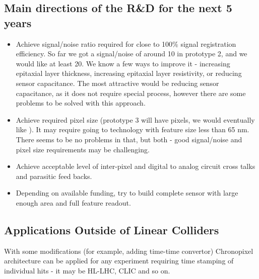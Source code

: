 \subsection{Main directions of the R\&D for the next 5 years}
\begin{itemize}
    \item Achieve signal/noise ratio required for close to 100\% signal registration efficiency. So far we got a signal/noise of around 10 in prototype 2, and we would like at least 20. We know a few ways to improve it - increasing epitaxial layer thickness, increasing epitaxial layer resistivity, or reducing sensor capacitance. The most attractive would be reducing sensor capacitance, as it does not require special process, however there are some problems to be solved with this approach.
    \item Achieve required pixel size (prototype 3 will have \unit[25]{\micron} pixels, we would eventually like \unit[15]{\micron}). It may require going to technology with feature size less than 65 nm. There seems to be no problems in that, but both - good signal/noise and pixel size requirements may be challenging.
    \item Achieve acceptable level of inter-pixel and digital to analog circuit cross talks and parasitic feed backs.
    \item Depending on available funding, try to build complete sensor with large enough area and full feature readout.
\end{itemize}
\subsection{Applications Outside of Linear Colliders}
     With some modifications (for example, adding time-time convertor) Chronopixel architecture can be applied for any experiment requiring time stamping of individual hits - it may be HL-LHC, CLIC and so on.
